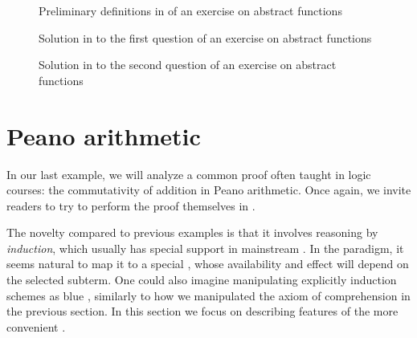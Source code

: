 \begin{figure}
  
  \caption{Preliminary definitions in  of an exercise on abstract functions}
\end{figure}

\begin{figure}
  
  \caption{Solution in  to the first question of an exercise on abstract functions}
\end{figure}

\begin{figure}
  
  \caption{Solution in  to the second question of an exercise on abstract functions}
\end{figure}


\section{Peano arithmetic}

In our last example, we will analyze a common proof often taught in logic
courses: the commutativity of addition in Peano arithmetic. Once again, we
invite readers to try to perform the proof themselves in
.

\AP
The novelty compared to previous examples is that it involves reasoning by
\emph{induction}, which usually has special support in mainstream . In the  paradigm, it seems natural to map it to a special
 , whose availability and effect will
depend on the selected subterm. One could also imagine manipulating explicitly
induction schemes as blue , similarly to how we manipulated the axiom
of comprehension in the previous section. In this section we focus on describing
features of the more convenient .

